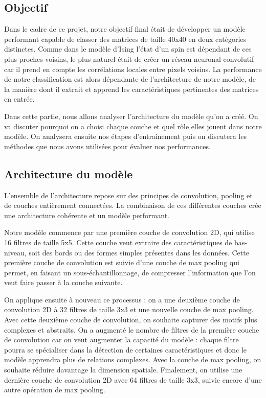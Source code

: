 \documentclass[11pt, parskip=half]{scrartcl} %
\begin{document}
\subsection{Objectif}
Dans le cadre de ce projet, notre objectif final était de développer un modèle performant capable de classer des matrices de taille 40x40 en deux catégories distinctes. Comme dans le modèle d’Ising l’état d’un spin est dépendant de ces plus proches voisins, le plus naturel était de créer un réseau neuronal convolutif car il prend en compte les corrélations locales entre pixels voisins. La performance de notre classification est alors dépendante de l’architecture de notre modèle, de la manière dont il extrait et apprend les caractéristiques pertinentes des matrices en entrée.

Dans cette partie, nous allons analyser l’architecture du modèle qu’on a créé. On va discuter pourquoi on a choisi chaque couche et quel rôle elles jouent dans notre modèle. On analysera ensuite nos étapes d’entraînement puis on discutera les méthodes que nous avons utilisées pour évaluer nos performances.

\subsection{Architecture du modèle}
L’ensemble de l’architecture repose sur des principes de convolution, pooling et de couches entièrement connectées. La combinaison de ces différentes couches crée une architecture cohérente et un modèle performant.

Notre modèle commence par une première couche de convolution 2D, qui utilise 16 filtres de taille 5x5. Cette couche veut extraire des caractéristiques de bas-niveau, soit des bords ou des formes simples présentes dans les données. Cette première couche de convolution est suivie d’une couche de max pooling qui permet, en faisant un sous-échantillonnage, de compresser l’information que l’on veut faire passer à la couche suivante.

On applique ensuite à nouveau ce processus : on a une deuxième couche de convolution 2D à 32 filtres de taille 3x3 et une nouvelle couche de max pooling. Avec cette deuxième couche de convolution, on souhaite capturer des motifs plus complexes et abstraits. On a augmenté le nombre de filtres de la première couche de convolution car on veut augmenter la capacité du modèle : chaque filtre pourra se spécialiser dans la détection de certaines caractéristiques et donc le modèle apprendra plus de relations complexes. Avec la couche de max pooling, on souhaite réduire davantage la dimension spatiale. Finalement, on utilise une dernière couche de convolution 2D avec 64 filtres de taille 3x3, suivie encore d’une autre opération de max pooling.
\end{document}

